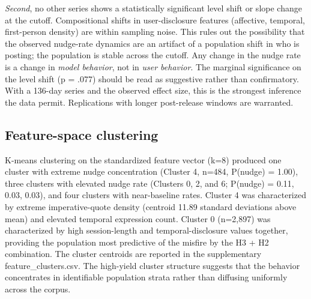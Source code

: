 \documentclass{obelus-preprint}
\begin{document}
\emph{Second}, no other series shows a statistically significant level shift or slope change at the cutoff. Compositional shifts in user-disclosure features (affective, temporal, first-person density) are within sampling noise. This rules out the possibility that the observed nudge-rate dynamics are an artifact of a population shift in who is posting; the population is stable across the cutoff. Any change in the nudge rate is a change in \emph{model behavior}, not in \emph{user behavior}.
The marginal significance on the level shift (p = .077) should be read as suggestive rather than confirmatory. With a 136-day series and the observed effect size, this is the strongest inference the data permit. Replications with longer post-release windows are warranted.
\subsection{Feature-space clustering}
K-means clustering on the standardized feature vector (k=8) produced one cluster with extreme nudge concentration (Cluster 4, n=484, P(nudge) = 1.00), three clusters with elevated nudge rate (Clusters 0, 2, and 6; P(nudge) = 0.11, 0.03, 0.03), and four clusters with near-baseline rates. Cluster 4 was characterized by extreme imperative-quote density (centroid 11.89 standard deviations above mean) and elevated temporal expression count. Cluster 0 (n=2,897) was characterized by high session-length and temporal-disclosure values together, providing the population most predictive of the misfire by the H3 + H2 combination.
The cluster centroids are reported in the supplementary feature\_clusters.csv. The high-yield cluster structure suggests that the behavior concentrates in identifiable population strata rather than diffusing uniformly across the corpus.
\end{document}
